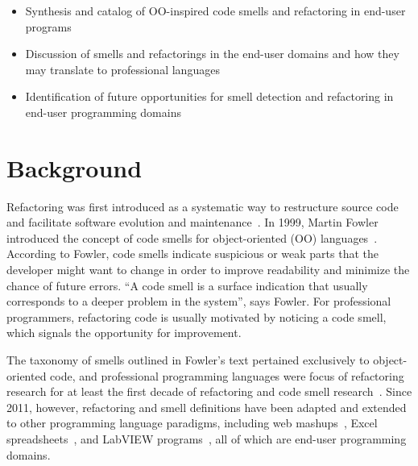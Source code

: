 \documentclass[10pt,conference,compsocconf]{IEEEtran}
\newcommand{\todo}[1]{\textbf{TODO: #1}}
\begin{document}
\begin{itemize}
	\item Synthesis and catalog of OO-inspired code smells  and refactoring in end-user programs
	\item Discussion of smells and refactorings in the end-user domains and how they may translate to professional languages
	\item Identification of future opportunities for smell detection and refactoring in end-user programming domains
\end{itemize}

\section{Background}
\label{sec:background}


Refactoring was first introduced as a systematic way to restructure source code and facilitate software evolution and maintenance~\cite{Opdyke:1992:ROF:169783, Griswold:1993:AAP:152388.152389}. In 1999, Martin Fowler introduced the concept of code smells for object-oriented (OO) languages~\cite{Fowl1999}. 
According to Fowler, code smells indicate suspicious or weak parts that the developer might want to change in order to improve readability and minimize the chance of future errors. ``A code smell is a surface indication that usually corresponds to a deeper problem in the system'', says Fowler. For professional programmers, refactoring code is usually motivated by noticing a code smell, which signals the opportunity for improvement.

The taxonomy of smells outlined in Fowler's text pertained exclusively to object-oriented code, and professional programming languages were focus of refactoring research for at least the first decade of refactoring and code smell research~\cite{Mens:2004:SSR:972215.972286}.
Since 2011, however, refactoring and smell definitions have been adapted and extended to other 
programming language paradigms, including web mashups~\cite{Stolee2011, StoleeTSE2013}, Excel spreadsheets~\cite{Hermans2011, Hermans2012inter, hermans2014bumblebee}, and LabVIEW programs~\cite{chambers2013smell}, all of which are end-user programming domains. 
\end{document}
